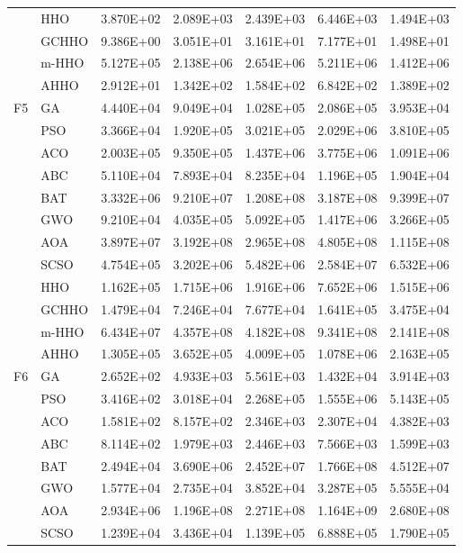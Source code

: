 \begin{longtable}{llrrrrr}
 & HHO & 3.870E+02 & 2.089E+03 & 2.439E+03 & 6.446E+03 & 1.494E+03 \\
 & GCHHO & 9.386E+00 & 3.051E+01 & 3.161E+01 & 7.177E+01 & 1.498E+01 \\
 & m-HHO & 5.127E+05 & 2.138E+06 & 2.654E+06 & 5.211E+06 & 1.412E+06 \\
 & AHHO & 2.912E+01 & 1.342E+02 & 1.584E+02 & 6.842E+02 & 1.389E+02 \\
\addlinespace
F5 & GA & 4.440E+04 & 9.049E+04 & 1.028E+05 & 2.086E+05 & 3.953E+04 \\
 & PSO & 3.366E+04 & 1.920E+05 & 3.021E+05 & 2.029E+06 & 3.810E+05 \\
 & ACO & 2.003E+05 & 9.350E+05 & 1.437E+06 & 3.775E+06 & 1.091E+06 \\
 & ABC & 5.110E+04 & 7.893E+04 & 8.235E+04 & 1.196E+05 & 1.904E+04 \\
 & BAT & 3.332E+06 & 9.210E+07 & 1.208E+08 & 3.187E+08 & 9.399E+07 \\
 & GWO & 9.210E+04 & 4.035E+05 & 5.092E+05 & 1.417E+06 & 3.266E+05 \\
 & AOA & 3.897E+07 & 3.192E+08 & 2.965E+08 & 4.805E+08 & 1.115E+08 \\
 & SCSO & 4.754E+05 & 3.202E+06 & 5.482E+06 & 2.584E+07 & 6.532E+06 \\
 & HHO & 1.162E+05 & 1.715E+06 & 1.916E+06 & 7.652E+06 & 1.515E+06 \\
 & GCHHO & 1.479E+04 & 7.246E+04 & 7.677E+04 & 1.641E+05 & 3.475E+04 \\
 & m-HHO & 6.434E+07 & 4.357E+08 & 4.182E+08 & 9.341E+08 & 2.141E+08 \\
 & AHHO & 1.305E+05 & 3.652E+05 & 4.009E+05 & 1.078E+06 & 2.163E+05 \\
\addlinespace
F6 & GA & 2.652E+02 & 4.933E+03 & 5.561E+03 & 1.432E+04 & 3.914E+03 \\
 & PSO & 3.416E+02 & 3.018E+04 & 2.268E+05 & 1.555E+06 & 5.143E+05 \\
 & ACO & 1.581E+02 & 8.157E+02 & 2.346E+03 & 2.307E+04 & 4.382E+03 \\
 & ABC & 8.114E+02 & 1.979E+03 & 2.446E+03 & 7.566E+03 & 1.599E+03 \\
 & BAT & 2.494E+04 & 3.690E+06 & 2.452E+07 & 1.766E+08 & 4.512E+07 \\
 & GWO & 1.577E+04 & 2.735E+04 & 3.852E+04 & 3.287E+05 & 5.555E+04 \\
 & AOA & 2.934E+06 & 1.196E+08 & 2.271E+08 & 1.164E+09 & 2.680E+08 \\
 & SCSO & 1.239E+04 & 3.436E+04 & 1.139E+05 & 6.888E+05 & 1.790E+05 \\

\end{longtable}

